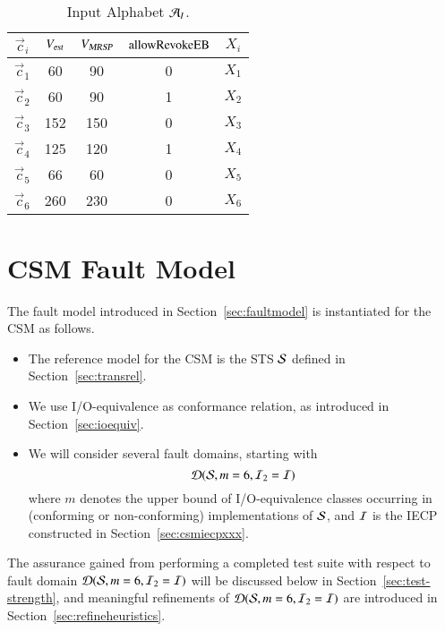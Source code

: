 \begin{table}[htdp]
\caption{Input Alphabet ${\cal A}_I$.}
\begin{center}
\begin{tabular}{|c||c|c|c||c|}
\hline\hline
$\vec c_i$&${V_{\text{\sl est}}}$&${V_{\text{\sl MRSP}}}$&$\text{allowRevokeEB}$&$X_i$ \\\hline\hline
$\vec c_1$&60&90&0&$X_1$ \\
$\vec c_2$&60&90&1&$ X_2$ \\
$\vec c_3$&152&150&0&$X_3$\\
$\vec c_4$&125&120&1&$X_4$\\
$\vec c_5$&66&60&0&$X_5$ \\
$\vec c_6$&260&230&0&$X_6$
\\\hline\hline
\end{tabular}
\end{center}
\label{tab:inputalphabet}
\end{table}


 



\section{CSM Fault Model}\label{sec:testhypo}

The fault model introduced in Section~\ref{sec:faultmodel} is instantiated for the CSM as follows.
\begin{itemize}
\item The reference model for the CSM is the STS ${\cal S}$ defined in Section~\ref{sec:transrel}.
\item We use  I/O-equivalence as conformance relation, as introduced in Section~\ref{sec:ioequiv}.
\item We will consider several fault domains, starting with
$$
{\cal D}({\cal S},m=6,{\cal I}_2 = {\cal I})
$$
where $m$ denotes the upper bound of I/O-equivalence classes occurring in (conforming or non-conforming) implementations of ${\cal S}$, and ${\cal I}$ is the IECP constructed in Section~\ref{sec:csmiecpxxx}.
\end{itemize}

The assurance gained from performing a completed test suite with respect to fault domain  ${\cal D}({\cal S},m=6,{\cal I}_2 = {\cal I})$ will be discussed below in Section~\ref{sec:test-strength}, and meaningful refinements of  ${\cal D}({\cal S},m=6,{\cal I}_2 = {\cal I})$ are introduced in Section~\ref{sec:refineheuristics}.



